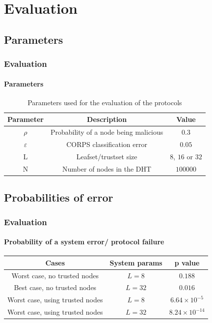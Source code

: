 \section{Evaluation}
\subsection{Parameters}
\begin{frame}
\frametitle{Evaluation}
\framesubtitle{Parameters}
  \begin{table}
    \centering
    \footnotesize
    \begin{tabular}{|ccc|}
      \hline
      \textbf{Parameter} & \textbf{Description} & \textbf{Value} \\
      \hline
      $\rho$ &  Probability of a node being malicious  & $0.3$  \\
      $\varepsilon$& CORPS classification error   & $0.05$ \\
      L &  Leafset/trustset size & $8$, $16$ or $32$  \\
      N &  Number of nodes in the DHT & $100000$  \\
      \hline
    \end{tabular}
    \caption{Parameters used for the evaluation of the protocols}
    \label{tab:variables_used}
  \end{table}
\end{frame}


\subsection{Probabilities of error}
\begin{frame}
\frametitle{Evaluation}
\framesubtitle{Probability of a system error/ protocol failure}
  \begin{table}
    \centering
    \footnotesize
    \begin{tabular}{|ccc|}
      \hline
      \textbf{Cases} & \textbf{System params} & \textbf{p value} \\
      \hline
      Worst case, no trusted nodes &  $L=8$  & $0.188$  \\
      Best case, no trusted nodes &  $L=32$  & $0.016$ \\
      Worst case, using trusted nodes &  $L=8$  & $6.64 \times 10^{-5}$ \\
      Worst case, using trusted nodes &  $L=32$  & $8.24 \times 10^{-14}$\\
      \hline
    \end{tabular}
  \end{table}
\end{frame}



